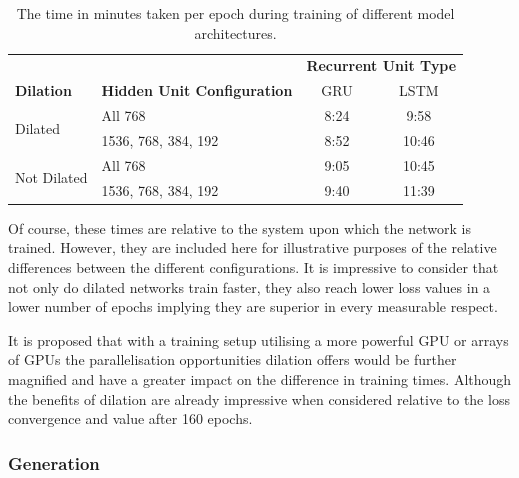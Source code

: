 \documentclass[12pt,]{article}
\begin{document}
\setlength\extrarowheight{1pt}
\begin{table}[H]
\centering
\caption{The time in minutes taken per epoch during training of different model architectures.}
\vspace{1em}
\begin{tabular}{llcc} 
\toprule
                             &                                    & \multicolumn{2}{c}{\textbf{Recurrent Unit Type}}  \\
\textbf{Dilation}            & \textbf{Hidden Unit Configuration} & GRU   & LSTM                                      \\ 
\hline
\multirow{2}{*}{Dilated}     & All 768                            & 8:24  & 9:58                                      \\ 
                             & 1536, 768, 384, 192                & 8:52  & 10:46                                     \\ 
\multirow{2}{*}{Not Dilated} & All 768                            & 9:05  & 10:45                                     \\ 
                             & 1536, 768, 384, 192                & 9:40  & 11:39                                     \\
\bottomrule
\end{tabular}
\end{table}

Of course, these times are relative to the system upon which the network
is trained. However, they are included here for illustrative purposes of
the relative differences between the different configurations. It is
impressive to consider that not only do dilated networks train faster,
they also reach lower loss values in a lower number of epochs implying
they are superior in every measurable respect.

It is proposed that with a training setup utilising a more powerful GPU
or arrays of GPUs the parallelisation opportunities dilation offers
would be further magnified and have a greater impact on the difference
in training times. Although the benefits of dilation are already
impressive when considered relative to the loss convergence and value
after 160 epochs.

\hypertarget{generation}{%
\subsubsection{Generation}\label{generation}}
\end{document}
